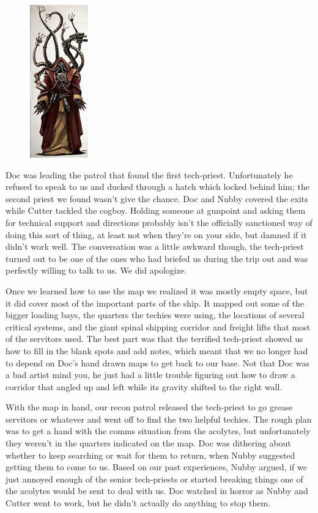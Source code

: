 \begin{figure}
	\begin{center}
		\includegraphics[width=\figwidth]{pics/7/13.png}
	\end{center}
\end{figure}
Doc was leading the patrol that found the first tech-priest. 
Unfortunately he refused to speak to us and ducked through a hatch which locked behind him; 
the second priest we found wasn’t give the chance. 
Doc and Nubby covered the exits while Cutter tackled the cogboy. 
Holding someone at gunpoint and asking them for technical support and directions probably isn’t the officially sanctioned way of doing this sort of thing, at least not when they’re on your side, but damned if it didn’t work well. 
The conversation was a little awkward though, the tech-priest turned out to be one of the ones who had briefed us during the trip out and was perfectly willing to talk to us. 
We did apologize.

Once we learned how to use the map we realized it was mostly empty space, but it did cover most of the important parts of the ship. 
It mapped out some of the bigger loading bays, the quarters the techies were using, the locations of several critical systems, and the giant spinal shipping corridor and freight lifts that most of the servitors used. 
The best part was that the terrified tech-priest showed us how to fill in the blank spots and add notes, which meant that we no longer had to depend on Doc’s hand drawn maps to get back to our base. 
Not that Doc was a bad artist mind you, he just had a little trouble figuring out how to draw a corridor that angled up and left while its gravity shifted to the right wall.

With the map in hand, our recon patrol released the tech-priest to go grease servitors or whatever and went off to find the two helpful techies. 
The rough plan was to get a hand with the comms situation from the acolytes, but unfortunately they weren’t in the quarters indicated on the map. 
Doc was dithering about whether to keep searching or wait for them to return, when Nubby suggested getting them to come to us. 
Based on our past experiences, Nubby argued, if we just annoyed enough of the senior tech-priests or started breaking things one of the acolytes would be sent to deal with us. 
Doc watched in horror as Nubby and Cutter went to work, but he didn’t actually do anything to stop them.

